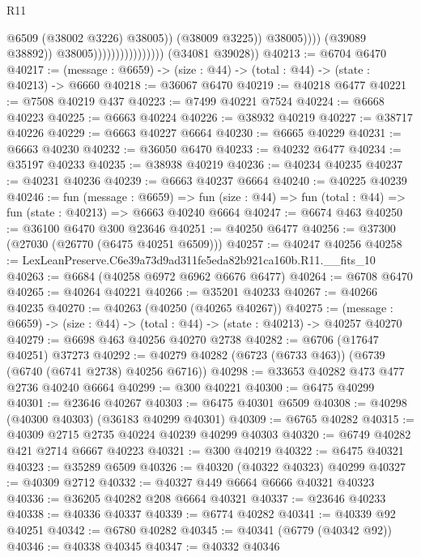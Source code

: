 \begin{lexlean}{R11}
\begin{coremodule}
                                                      @6509
                                                      (@38002 @3226)
                                                      @38005))
                                                  (@38009 @3225))
                                                @38005))))
                                        (@39089 @38892))
                                      @38005))))))))))))))))
      (@34081 @39028))
@40213 := @6704 @6470
@40217 := (message : @6659) -> (size : @44) -> (total : @44) -> (state : @40213) -> @6660
@40218 := @36067 @6470
@40219 := @40218 @6477
@40221 := @7508 @40219 @437
@40223 := @7499 @40221 @7524
@40224 := @6668 @40223
@40225 := @6663 @40224
@40226 := @38932 @40219
@40227 := @38717 @40226
@40229 := @6663 @40227 @6664
@40230 := @6665 @40229
@40231 := @6663 @40230
@40232 := @36050 @6470
@40233 := @40232 @6477
@40234 := @35197 @40233
@40235 := @38938 @40219
@40236 := @40234 @40235
@40237 := @40231 @40236
@40239 := @6663 @40237 @6664
@40240 := @40225 @40239
@40246 := fun (message : @6659) =>
  fun (size : @44) => fun (total : @44) => fun (state : @40213) => @6663 @40240 @6664
@40247 := @6674 @463
@40250 := @36100 @6470 @300 @23646
@40251 := @40250 @6477
@40256 := @37300 (@27030 (@26770 (@6475 @40251 @6509)))
@40257 := @40247 @40256
@40258 := LexLeanPreserve.C6e39a73d9ad311fe5eda82b921ca160b.R11.__fits_10
@40263 := @6684 (@40258 @6972 @6962 @6676 @6477)
@40264 := @6708 @6470
@40265 := @40264 @40221
@40266 := @35201 @40233
@40267 := @40266 @40235
@40270 := @40263 (@40250 (@40265 @40267))
@40275 := (message : @6659) -> (size : @44) -> (total : @44) -> (state : @40213) -> @40257 @40270
@40279 := @6698 @463 @40256 @40270 @2738
@40282 := @6706 (@17647 @40251) @37273
@40292 := @40279 @40282 (@6723 (@6733 @463)) (@6739 (@6740 (@6741 @2738) @40256 @6716))
@40298 := @33653 @40282 @473 @477 @2736 @40240 @6664
@40299 := @300 @40221
@40300 := @6475 @40299
@40301 := @23646 @40267
@40303 := @6475 @40301 @6509
@40308 := @40298 (@40300 @40303) (@36183 @40299 @40301)
@40309 := @6765 @40282
@40315 := @40309 @2715 @2735 @40224 @40239 @40299 @40303
@40320 := @6749 @40282 @421 @2714 @6667 @40223
@40321 := @300 @40219
@40322 := @6475 @40321
@40323 := @35289 @6509
@40326 := @40320 (@40322 @40323) @40299
@40327 := @40309 @2712
@40332 := @40327 @449 @6664 @6666 @40321 @40323
@40336 := @36205 @40282 @208 @6664 @40321
@40337 := @23646 @40233
@40338 := @40336 @40337
@40339 := @6774 @40282
@40341 := @40339 @92 @40251
@40342 := @6780 @40282
@40345 := @40341 (@6779 (@40342 @92))
@40346 := @40338 @40345
@40347 := @40332 @40346

\end{coremodule}
\end{lexlean}
